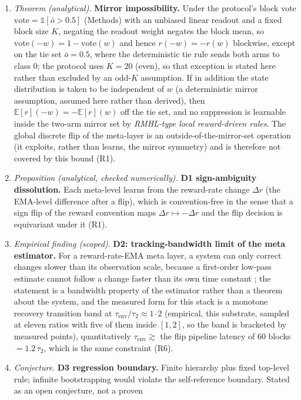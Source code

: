 \documentclass[preprint,12pt]{elsarticle}
\begin{document}
\begin{enumerate}[label=\arabic*.]
\item \emph{Theorem (analytical).} \textbf{Mirror impossibility.} Under the protocol's block vote
$\mathrm{vote}=\mathbb 1[\bar o>0.5]$ (Methods) with an unbiased linear
readout and a fixed block size $K$, negating the readout weight negates the
block mean, so $\mathrm{vote}(-w)=1-\mathrm{vote}(w)$ and hence
$r(-w)=-r(w)$ blockwise, except on the tie set $\bar o=0.5$, where the
deterministic tie rule sends both arms to class $0$; the protocol uses
$K=20$ (even), so that exception is stated here rather than excluded by an
odd-$K$ assumption. If in addition the state distribution is taken to be
independent of $w$ (a deterministic mirror assumption, assumed here
rather than derived), then $\mathbb E[r](-w)=-\mathbb E[r](w)$ off the
tie set, and no suppression is learnable inside the
two-arm mirror set by \emph{RMHL-type local reward-driven rules}. The
global discrete flip of the meta-layer is an outside-of-the-mirror-set
operation (it exploits, rather than learns, the mirror symmetry) and is
therefore not covered by this bound (R1).
\item \emph{Proposition (analytical, checked numerically).} \textbf{D1 sign-ambiguity dissolution.} Each meta-level learns from the
reward-rate change $\Delta r$ (the EMA-level difference after a flip),
which is convention-free in the sense that a sign flip of the reward
convention maps $\Delta r\mapsto-\Delta r$ and the flip decision is
equivariant under it (R1).
\item \emph{Empirical finding (scoped)}. \textbf{D2: tracking-bandwidth limit of the meta estimator.} For a
reward-rate-EMA meta layer, a system can only correct
changes slower than its observation scale, because a first-order low-pass
estimate cannot follow a change faster than its own time constant
\cite{haykin2002}; the statement is a bandwidth property of the estimator
rather than a theorem about the system, and the measured form for this stack is
a monotone
recovery transition band at
$\tau_{\mathrm{env}}/\tau_2\approx1$--$2$ (empirical, this substrate, sampled
at eleven ratios with five of them inside $[1,2]$, so the band is bracketed by
measured points),
quantitatively $\tau_{\mathrm{env}}\gtrsim$ the flip pipeline latency of $60$
blocks $=1.2\,\tau_2$, which is the same constraint (R6).
\item \emph{Conjecture}. \textbf{D3 regression boundary.} Finite hierarchy plus
fixed top-level rule; infinite bootstrapping would violate the
self-reference boundary. Stated as an open conjecture, not a proven

\end{enumerate}
\end{document}
